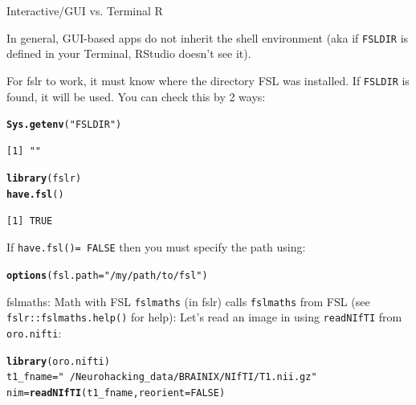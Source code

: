 \documentclass[11pt]{beamer}\usepackage[]{graphicx}\usepackage[]{color}
\makeatletter
\newcommand{\hlnum}[1]{\textcolor[rgb]{0.686,0.059,0.569}{#1}}%
\newcommand{\hlstr}[1]{\textcolor[rgb]{0.192,0.494,0.8}{#1}}%
\newcommand{\hlstd}[1]{\textcolor[rgb]{0.345,0.345,0.345}{#1}}%
\newcommand{\hlkwb}[1]{\textcolor[rgb]{0.69,0.353,0.396}{#1}}%
\newcommand{\hlkwc}[1]{\textcolor[rgb]{0.333,0.667,0.333}{#1}}%
\newcommand{\hlkwd}[1]{\textcolor[rgb]{0.737,0.353,0.396}{\textbf{#1}}}%
\newenvironment{kframe}{%
 \def\at@end@of@kframe{}%
 \ifinner\ifhmode%
  \def\at@end@of@kframe{\end{minipage}}%
  \begin{minipage}{\columnwidth}%
 \fi\fi%
 \def\FrameCommand##1{\hskip\@totalleftmargin \hskip-\fboxsep
 \colorbox{shadecolor}{##1}\hskip-\fboxsep
     \hskip-\linewidth \hskip-\@totalleftmargin \hskip\columnwidth}%
 \MakeFramed {\advance\hsize-\width
   \@totalleftmargin\z@ \linewidth\hsize
   \@setminipage}}%
 {\par\unskip\endMakeFramed%
 \at@end@of@kframe}
\newenvironment{knitrout}{}{} %
\makeatother
\begin{document}
\begin{frame}[fragile]{Interactive/GUI vs. Terminal R}

In general, GUI-based apps do not inherit the shell environment (aka if \verb|FSLDIR| is defined in your Terminal, RStudio doesn't see it).

For fslr to work, it must know where the directory FSL was installed.  If \verb|FSLDIR| is found, it will be used.  You can check this by 2 ways:

\begin{knitrout}
\color{fgcolor}\begin{kframe}
\begin{alltt}
\hlkwd{Sys.getenv}\hlstd{(}\hlstr{"FSLDIR"}\hlstd{)}
\end{alltt}
\begin{verbatim}
[1] ""
\end{verbatim}
\begin{alltt}
\hlkwd{library}\hlstd{(fslr)}
\hlkwd{have.fsl}\hlstd{()}
\end{alltt}
\begin{verbatim}
[1] TRUE
\end{verbatim}
\end{kframe}
\end{knitrout}

If \verb|have.fsl()= FALSE| then you must specify the path using:

\begin{knitrout}
\color{fgcolor}\begin{kframe}
\begin{alltt}
\hlkwd{options}\hlstd{(}\hlkwc{fsl.path}\hlstd{=}\hlstr{"/my/path/to/fsl"}\hlstd{)}
\end{alltt}
\end{kframe}
\end{knitrout}



\end{frame}


\begin{frame}[fragile]{fslmaths: Math with FSL}
\verb|fslmaths| (in fslr) calls \verb|fslmaths| from FSL (see \verb|fslr::fslmaths.help()| for help):
Let's read an image in using \verb|readNIfTI| from \verb|oro.nifti|:

\begin{knitrout}
\color{fgcolor}\begin{kframe}
\begin{alltt}
\hlkwd{library}\hlstd{(oro.nifti)}
\hlstd{t1_fname} \hlkwb{=} \hlstr{"~/Neurohacking_data/BRAINIX/NIfTI/T1.nii.gz"}
\hlstd{nim} \hlkwb{=} \hlkwd{readNIfTI}\hlstd{(t1_fname,} \hlkwc{reorient}\hlstd{=}\hlnum{FALSE}\hlstd{)}
\end{alltt}
\end{kframe}
\end{knitrout}
\end{frame}
\end{document}
